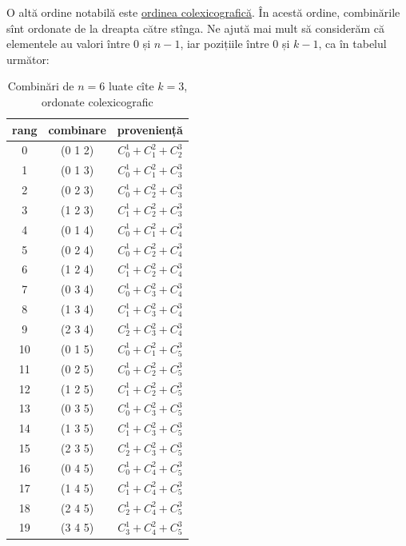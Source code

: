 \documentclass[../main.tex]{subfiles}
\begin{document}
O altă ordine notabilă este \href{https://en.wikiversity.org/wiki/Lexicographic_and_colexicographic_order}{ordinea colexicografică}. În acestă ordine, combinările sînt ordonate de la dreapta către stînga. Ne ajută mai mult să considerăm că elementele au valori între $0$ și $n-1$, iar pozițiile între $0$ și $k-1$, ca în tabelul următor:

\begin{table}[H]
  \centering
  \begin{tabular}{ccc}
    \textbf{rang} & \textbf{combinare} & \textbf{proveniență}\\
    \hline
     0 & (0 1 2) & $C_0^1 + C_1^2 + C_2^3$ \\
     1 & (0 1 3) & $C_0^1 + C_1^2 + C_3^3$ \\
     2 & (0 2 3) & $C_0^1 + C_2^2 + C_3^3$ \\
     3 & (1 2 3) & $C_1^1 + C_2^2 + C_3^3$ \\
     4 & (0 1 4) & $C_0^1 + C_1^2 + C_4^3$ \\
     5 & (0 2 4) & $C_0^1 + C_2^2 + C_4^3$ \\
     6 & (1 2 4) & $C_1^1 + C_2^2 + C_4^3$ \\
     7 & (0 3 4) & $C_0^1 + C_3^2 + C_4^3$ \\
     8 & (1 3 4) & $C_1^1 + C_3^2 + C_4^3$ \\
     9 & (2 3 4) & $C_2^1 + C_3^2 + C_4^3$ \\
    10 & (0 1 5) & $C_0^1 + C_1^2 + C_5^3$ \\
    11 & (0 2 5) & $C_0^1 + C_2^2 + C_5^3$ \\
    12 & (1 2 5) & $C_1^1 + C_2^2 + C_5^3$ \\
    13 & (0 3 5) & $C_0^1 + C_3^2 + C_5^3$ \\
    14 & (1 3 5) & $C_1^1 + C_3^2 + C_5^3$ \\
    15 & (2 3 5) & $C_2^1 + C_3^2 + C_5^3$ \\
    16 & (0 4 5) & $C_0^1 + C_4^2 + C_5^3$ \\
    17 & (1 4 5) & $C_1^1 + C_4^2 + C_5^3$ \\
    18 & (2 4 5) & $C_2^1 + C_4^2 + C_5^3$ \\
    19 & (3 4 5) & $C_3^1 + C_4^2 + C_5^3$ \\
    \hline
  \end{tabular}

  \caption{Combinări de $n=6$ luate cîte $k=3$, ordonate colexicografic}
\end{table}
\end{document}
